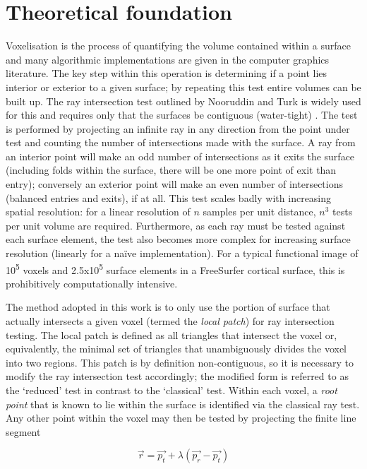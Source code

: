 \section{Theoretical foundation}

Voxelisation is the process of quantifying the volume contained within a surface and many algorithmic implementations are given in the computer graphics literature. The key step within this operation is determining if a point lies interior or exterior to a given surface; by repeating this test entire volumes can be built up. The ray intersection test outlined by Nooruddin and Turk is widely used for this and requires only that the surfaces be contiguous (water-tight) \cite{Nooruddin2003}. The test is performed by projecting an infinite ray in any direction from the point under test and counting the number of intersections made with the surface. A ray from an interior point will make an odd number of intersections as it exits the surface (including folds within the surface, there will be one more point of exit than entry); conversely an exterior point will make an even number of intersections (balanced entries and exits), if at all. This test scales badly with increasing spatial resolution: for a linear resolution of $n$ samples per unit distance, $n^3$ tests per unit volume are required. Furthermore, as each ray must be tested against each surface element, the test also becomes more complex for increasing surface resolution (linearly for a naïve implementation). For a typical functional image of 10\textsuperscript{5} voxels and 2.5x10\textsuperscript{5} surface elements in a FreeSurfer cortical surface, this is prohibitively computationally intensive.

The method adopted in this work is to only use the portion of surface that actually intersects a given voxel (termed the \textit{local patch}) for ray intersection testing. The local patch is defined as all triangles that intersect the voxel or, equivalently, the minimal set of triangles that unambiguously divides the voxel into two regions. This patch is by definition non-contiguous, so it is necessary to modify the ray intersection test accordingly; the modified form is referred to as the ‘reduced’ test in contrast to the ‘classical’ test. Within each voxel, a \textit{root point} that is known to lie within the surface is identified via the classical ray test. Any other point within the voxel may then be tested by projecting the finite line segment 

\begin{equation}
\vec{r} = \vec{p_t} + \lambda(\vec{p_r} - \vec{p_t})
\end{equation} 

